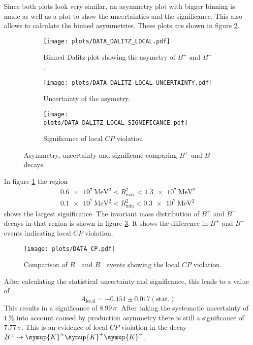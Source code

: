 Since both plots look very similar, an asymmetry plot with bigger binning is made as well as a plot to show the uncertainties and the significance.
This also allows to calculate the binned asymmetries.
These plots are shown in figure \ref{fig:DalitzLocal}.

\begin{figure}[!htb]
\centering
\begin{subfigure}{0.49\textwidth}
  \centering
  \texttt{[image: plots/DATA\_DALITZ\_LOCAL.pdf]}
  \caption{Binned Dalitz plot showing the asymetry of $B^+$ and $B^-$.}

\end{subfigure}
\begin{subfigure}{0.49\textwidth}
  \centering
  \texttt{[image: plots/DATA\_DALITZ\_LOCAL\_UNCERTAINTY.pdf]}
  \caption{Uncertainty of the asymetry.}

\end{subfigure}
\begin{subfigure}{0.49\textwidth}
  \centering
  \texttt{[image: plots/DATA\_DALITZ\_LOCAL\_SIGNIFICANCE.pdf]}
  \caption{Significance of local $C\!P$ violation}
  \label{fig:DalitzSignificance}

\end{subfigure}

\caption{Asymmetry, uncertainty and significane comparing $B^+$ and $B^-$ decays.}
\label{fig:DalitzLocal}
\end{figure}

In figure \ref{fig:DalitzSignificance} the region
\begin{align*}
 \SI{0.6e7}{\mega\electronvolt\squared} < R_\text{max}^2 < \SI{1.3e7}{\mega\electronvolt\squared}\\
 \SI{0.1e7}{\mega\electronvolt\squared} < R_\text{min}^2 < \SI{0.3e7}{\mega\electronvolt\squared}
\end{align*}
shows the largest significance.
The invariant mass distribution of $B^+$ and $B^-$ decays in that region is shown in figure \ref{fig:BPM}.
It shows the difference in $B^+$ and $B^-$ events indicating local $C\!P$ violation.

\begin{figure}[!htb]
  \centering
  \texttt{[image: plots/DATA\_CP.pdf]}
  \caption{Comparison of $B^+$ and $B^-$ events showing the local $C\!P$ violation.}
  \label{fig:BPM}
\end{figure}

After calculating the statistical uncertainty and significance, this leads to a value of
\begin{equation*}
  A_\text{local}= -0.154 \pm 0.017 (\text{stat.})
\end{equation*}
This results in a significance of $8.99\,\sigma$.
After taking the systematic uncertainty of $1\,\%$ into account caused by production asymmetry there is still a significance of $7.77\,\sigma$.
This is an evidence of local $C\!P$ violation in the decay $B^{\pm} \to \symup{K}^{\pm} \symup{K}^{+} \symup{K}^{-}$.
